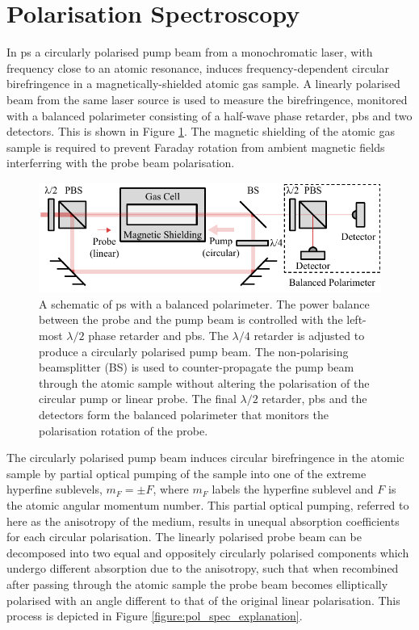 \section{Polarisation Spectroscopy}%
\label{section:pol_spec_theory}

In \gls{ps} a circularly polarised pump beam from a monochromatic laser, with frequency close to an atomic resonance, induces frequency-dependent circular birefringence in a magnetically-shielded atomic gas sample.
A linearly polarised beam from the same laser source is used to measure the birefringence, monitored with a balanced polarimeter consisting of a half-wave phase retarder, \gls{pbs} and two detectors.
This is shown in Figure \ref{figure:pol_spec_schematic}.
The magnetic shielding of the atomic gas sample is required to prevent Faraday rotation from ambient magnetic fields interferring with the probe beam polarisation.

\begin{figure}
\centering
\includegraphics[width=\linewidth]{part1/Figs/PolSpecSchematic.pdf}
\caption{A schematic of \gls{ps} with a balanced polarimeter.
The power balance between the probe and the pump beam is controlled with the left-most $\lambda/2$ phase retarder and \gls{pbs}.
The $\lambda/4$ retarder is adjusted to produce a circularly polarised pump beam.
The non-polarising beamsplitter (BS) is used to counter-propagate the pump beam through the atomic sample without altering the polarisation of the circular pump or linear probe.
The final $\lambda/2$ retarder, \gls{pbs} and the detectors form the balanced polarimeter that monitors the polarisation rotation of the probe.}
\label{figure:pol_spec_schematic}
\end{figure}

The circularly polarised pump beam induces circular birefringence in the atomic sample by partial optical pumping of the sample into one of the extreme hyperfine sublevels, $m_F=\pm F$, where $m_F$ labels the hyperfine sublevel and $F$ is the atomic angular momentum number.
This partial optical pumping, referred to here as the anisotropy of the medium, results in unequal absorption coefficients for each circular polarisation.
The linearly polarised probe beam can be decomposed into two equal and oppositely circularly polarised components which undergo different absorption due to the anisotropy, such that when recombined after passing through the atomic sample the probe beam becomes elliptically polarised with an angle different to that of the original linear polarisation.
This process is depicted in Figure \ref{figure:pol_spec_explanation}.

